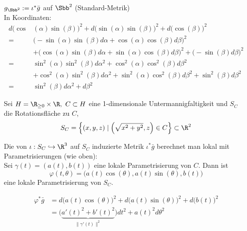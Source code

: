 \begin{exmp*}
	$ g_{\Sbb^2} := \iota^*\bar{g} $ auf $\Sbb^2$ \hfill (Standard-Metrik)\\
	In Koordinaten:
	\begin{align*}
		d\big(\cos&(\alpha) \sin(\beta)\big)^2 + d\big(\sin(\alpha)\sin(\beta)\big)^2 + d\big(\cos(\beta)\big)^2 \\
		=& \big(-\sin(\alpha)\sin(\beta)d\alpha + \cos(\alpha)\cos(\beta)d\beta\big)^2 \\
		&+ \big(\cos(\alpha)\sin(\beta)d\alpha + \sin(\alpha)\cos(\beta)d\beta\big)^2 + \big(-\sin(\beta)d\beta\big)^2\\
		=& \sin^2(\alpha) \sin^2(\beta) d\alpha^2 + \cos^2(\alpha) \cos^2(\beta) d\beta^2\\
		&+ \cos^2(\alpha) \sin^2(\beta) d\alpha^2 + \sin^2(\alpha) \cos^2(\beta) d\beta^2 + \sin^2(\beta) d\beta^2\\
		=& \sin^2(\beta) d\alpha^2 + d\beta^2
	\end{align*}
\end{exmp*}

\begin{exmp*}
	Sei $ H = \R_{\geq 0} \times \R,\ C \subset H $ eine 1-dimensionale Untermannigfaltigkeit und $ S_C $ die Rotationsfläche zu $C$,
	\[ S_C = \left\{(x,y,z) \mid \left( \sqrt{x^2+y^2},z \right) \in C \right\} \subset \R^2 \]
	\begin{minipage}{\linewidth}
		\begin{wrapfigure}{l}{6cm}
		\end{wrapfigure}
		Die von $\iota: S_C \hookrightarrow \R^3$ auf $S_C$ induzierte Metrik $\iota^*\bar{g}$ berechnet man lokal mit Parametrisierungen (wie oben):\\
		Sei $ \gamma(t) = (a(t),b(t)) $ eine lokale Parametrisierung von $C$. Dann ist
		\[ \varphi(t,\theta) = \big( a(t)\cos(\theta), a(t)\sin(\theta),b(t) \big) \]
		eine lokale Parametrisierung von $S_C$.
	\end{minipage}
	\begin{align*}
		\varphi^*\bar{g} &= d\big( a(t)\cos(\theta) \big)^2 + d\big( a(t)\sin(\theta) \big)^2 + d\big( b(t) \big)^2\\
		&= \big( \underbrace{a'(t)^2 + b'(t)^2}_{\|\gamma'(t)\|^2} \big)dt^2 + a(t)^2d\theta^2
	\end{align*}
\end{exmp*}

\subsection*{}

